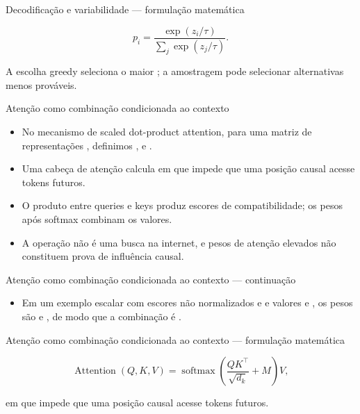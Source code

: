 \documentclass[10pt,aspectratio=169]{beamer}
\begin{document}
\begin{frame}[t]{Decodificação e variabilidade — formulação matemática}
\small
\vspace{3mm}\begin{center}\small\[p_i=\frac{\exp(z_i/\tau)}{\sum_j\exp(z_j/\tau)}.\]\end{center}
\vspace{3mm}\small A escolha greedy seleciona o maior ; a amostragem pode selecionar alternativas menos prováveis.
\end{frame}

\begin{frame}[t]{Atenção como combinação condicionada ao contexto}
\small
\begin{itemize}
\item No mecanismo de scaled dot-product attention, para uma matriz de representações , definimos , e .
\item Uma cabeça de atenção calcula em que impede que uma posição causal acesse tokens futuros.
\item O produto entre queries e keys produz escores de compatibilidade; os pesos após softmax combinam os valores.
\item A operação não é uma busca na internet, e pesos de atenção elevados não constituem prova de influência causal.
\end{itemize}
\end{frame}

\begin{frame}[t]{Atenção como combinação condicionada ao contexto — continuação}
\small
\begin{itemize}
\item Em um exemplo escalar com escores não normalizados e e valores e , os pesos são e , de modo que a combinação é .
\end{itemize}
\end{frame}

\begin{frame}[t]{Atenção como combinação condicionada ao contexto — formulação matemática}
\small
\vspace{3mm}\begin{center}\small\[\operatorname{Attention}(Q,K,V)=\operatorname{softmax}\!\left(\frac{QK^\top}{\sqrt{d_k}}+M\right)V,\]\end{center}
\vspace{3mm}\small em que impede que uma posição causal acesse tokens futuros.
\end{frame}
\end{document}
